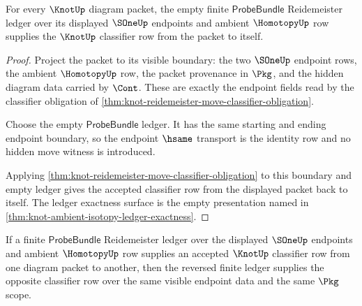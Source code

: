 \begin{theorem}\label{thm:knot-reidemeister-empty-ledger-reflexivity}
For every $\KnotUp$ diagram packet, the empty finite $\mathsf{ProbeBundle}$ Reidemeister ledger over its displayed $\SOneUp$ endpoints and ambient $\HomotopyUp$ row supplies the $\KnotUp$ classifier row from the packet to itself.
\end{theorem}

\begin{proof}
Project the packet to its visible boundary: the two $\SOneUp$ endpoint rows, the ambient $\HomotopyUp$ row, the packet provenance in $\Pkg$, and the hidden diagram data carried by $\Cont$. These are exactly the endpoint fields read by the classifier obligation of \autoref{thm:knot-reidemeister-move-classifier-obligation}.

Choose the empty $\mathsf{ProbeBundle}$ ledger. It has the same starting and ending endpoint boundary, so the endpoint $\hsame$ transport is the identity row and no hidden move witness is introduced.

Applying \autoref{thm:knot-reidemeister-move-classifier-obligation} to this boundary and empty ledger gives the accepted classifier row from the displayed packet back to itself. The ledger exactness surface is the empty presentation named in \autoref{thm:knot-ambient-isotopy-ledger-exactness}.
\end{proof}

\begin{theorem}\label{thm:knot-reidemeister-reversal-ledger-symmetry}
If a finite $\mathsf{ProbeBundle}$ Reidemeister ledger over the displayed $\SOneUp$ endpoints and ambient $\HomotopyUp$ row supplies an accepted $\KnotUp$ classifier row from one diagram packet to another, then the reversed finite ledger supplies the opposite classifier row over the same visible endpoint data and the same $\Pkg$ scope.
\end{theorem}

